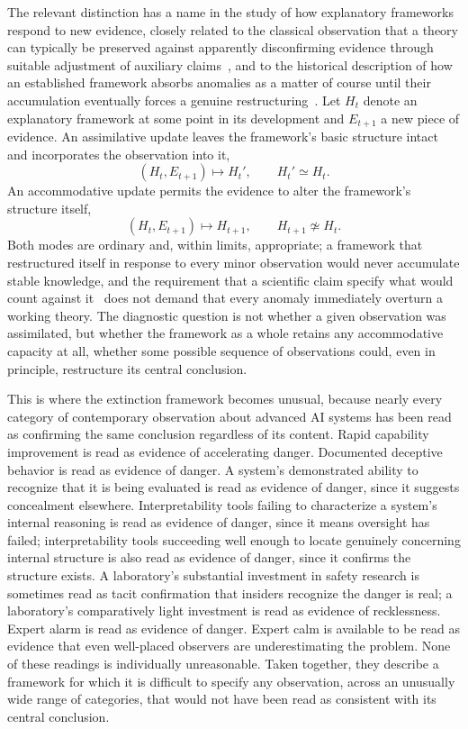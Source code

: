 \documentclass[11pt]{article}
\begin{document}
The relevant distinction has a name in the study of how explanatory frameworks respond to new evidence, closely related to the classical observation that a theory can typically be preserved against apparently disconfirming evidence through suitable adjustment of auxiliary claims~\cite{duhem1954,quine1951}, and to the historical description of how an established framework absorbs anomalies as a matter of course until their accumulation eventually forces a genuine restructuring~\cite{kuhn1962}. Let $H_t$ denote an explanatory framework at some point in its development and $E_{t+1}$ a new piece of evidence. An assimilative update leaves the framework's basic structure intact and incorporates the observation into it,
\[
(H_t, E_{t+1}) \longmapsto H_t', \qquad H_t' \simeq H_t.
\]
An accommodative update permits the evidence to alter the framework's structure itself,
\[
(H_t, E_{t+1}) \longmapsto H_{t+1}, \qquad H_{t+1} \not\simeq H_t.
\]
Both modes are ordinary and, within limits, appropriate; a framework that restructured itself in response to every minor observation would never accumulate stable knowledge, and the requirement that a scientific claim specify what would count against it~\cite{popper1959} does not demand that every anomaly immediately overturn a working theory. The diagnostic question is not whether a given observation was assimilated, but whether the framework as a whole retains any accommodative capacity at all, whether some possible sequence of observations could, even in principle, restructure its central conclusion.

This is where the extinction framework becomes unusual, because nearly every category of contemporary observation about advanced AI systems has been read as confirming the same conclusion regardless of its content. Rapid capability improvement is read as evidence of accelerating danger. Documented deceptive behavior is read as evidence of danger. A system's demonstrated ability to recognize that it is being evaluated is read as evidence of danger, since it suggests concealment elsewhere. Interpretability tools failing to characterize a system's internal reasoning is read as evidence of danger, since it means oversight has failed; interpretability tools succeeding well enough to locate genuinely concerning internal structure is also read as evidence of danger, since it confirms the structure exists. A laboratory's substantial investment in safety research is sometimes read as tacit confirmation that insiders recognize the danger is real; a laboratory's comparatively light investment is read as evidence of recklessness. Expert alarm is read as evidence of danger. Expert calm is available to be read as evidence that even well-placed observers are underestimating the problem. None of these readings is individually unreasonable. Taken together, they describe a framework for which it is difficult to specify any observation, across an unusually wide range of categories, that would not have been read as consistent with its central conclusion.
\end{document}
